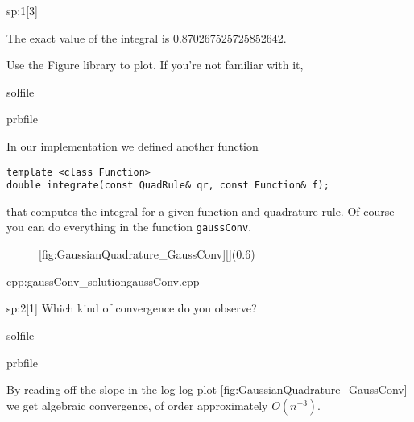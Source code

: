 \begin{samproblem}
\begin{subproblem}{sp:1}[3]
  \begin{samhint}
    The exact value of the integral is 0.870267525725852642.
  \end{samhint}

  \begin{samhint}
    Use the Figure library to plot. If you're not familiar with it, 
  \end{samhint}
  \begin{samwriteprbpart}{solfile}
    \begin{writeverbatim}{prbfile}
      \begin{samsolution}
        In our implementation we defined another function 
        \begin{lstlisting}[style=cpp]
template <class Function>
double integrate(const QuadRule& qr, const Function& f);
        \end{lstlisting}
        that computes the integral for a given function and quadrature rule.
        Of course you can do everything in the function \texttt{gaussConv}.
        \begin{figure}
          \centering
          [fig:GaussianQuadrature_GaussConv][](0.6\textwidth)
        \end{figure}
        \begin{samcode}[C++-code]{cpp:gaussConv_solution}{gaussConv.cpp}
          
        \end{samcode}
      \end{samsolution}
    \end{writeverbatim}
  \end{samwriteprbpart}

\end{subproblem}



\begin{subproblem}{sp:2}[1] 
Which kind of convergence do you observe?

  \begin{samwriteprbpart}{solfile}
    \begin{writeverbatim}{prbfile}
      \begin{samsolution}
        By reading off the slope in the log-log plot \ref{fig:GaussianQuadrature_GaussConv} we get
        algebraic convergence, of order approximately $O(n^{-3})$.
      \end{samsolution}
    \end{writeverbatim}
  \end{samwriteprbpart}
\end{subproblem}


\end{samproblem}
